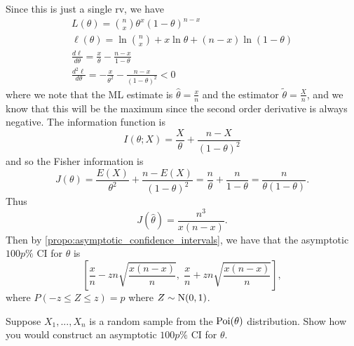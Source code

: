\documentclass[notoc,notitlepage]{tufte-book}
\begin{document}
\begin{solution}
  Since this is just a single rv, we have
  \begin{gather*}
    L(\theta) = \binom{n}{x} \theta^x ( 1 - \theta )^{n - x} \\
    \ell(\theta) = \ln \binom{n}{x} + x \ln \theta + (n - x) \ln (1 - \theta) \\
    \frac{d \ell}{d \theta} = \frac{x}{\theta} - \frac{n - x}{1 - \theta} \\
    \frac{d^2 \ell}{d \theta} = - \frac{x}{\theta^2} - \frac{n - x}{(1 - \theta)^2} < 0
  \end{gather*}
  where we note that the ML estimate is $\hat{\theta} = \frac{x}{n}$ and the estimator $\tilde{\theta} = \frac{X}{n}$, and we know that this will be the maximum since the second order derivative is always negative. The information function is
  \begin{equation*}
    I(\theta; X) = \frac{X}{\theta} + \frac{n - X}{(1 - \theta)^2}
  \end{equation*}
  and so the Fisher information is
  \begin{equation*}
    J(\theta) = \frac{E(X)}{\theta^2} + \frac{n - E(X)}{(1 - \theta)^2} = \frac{n}{\theta} + \frac{n}{1 - \theta} = \frac{n}{\theta ( 1 - \theta )}.
  \end{equation*}
  Thus
  \begin{equation*}
    J(\hat{\theta}) = \frac{n^3}{x(n - x)}.
  \end{equation*}
  Then by \cref{propo:asymptotic_confidence_intervals}, we have that the asymptotic $100p\%$ CI for $\theta$ is
  \begin{equation*}
    \left[ \frac{x}{n} - zn \sqrt{\frac{x ( n - x )}{n}}, \; \frac{x}{n} + zn \sqrt{\frac{x (n - x)}{n}} \right],
  \end{equation*}
  where $P(-z \leq Z \leq z) = p$ where $Z \sim \operatorname{N}(0, 1)$.
\end{solution}

\begin{eg}\label{eg:6_23}
  Suppose $X_1, ... ,X_n$ is a random sample from the $\operatorname{Poi}(\theta)$ distribution. Show how you would construct an asymptotic $100p\%$ CI for $\theta$.
\end{eg}
\end{document}
